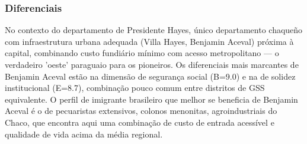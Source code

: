\subsubsection*{Diferenciais}\label{dif-benjamin-aceval-1502}
No contexto do departamento de Presidente Hayes, único departamento chaqueño com infraestrutura urbana adequada (Villa Hayes, Benjamin Aceval) próxima à capital, combinando custo fundiário mínimo com acesso metropolitano — o verdadeiro 'oeste' paraguaio para os pioneiros. Os diferenciais mais marcantes de Benjamin Aceval estão na dimensão de segurança social (B=9.0) e na de solidez institucional (E=8.7), combinação pouco comum entre distritos de GSS equivalente. O perfil de imigrante brasileiro que melhor se beneficia de Benjamin Aceval é o de pecuaristas extensivos, colonos menonitas, agroindustriais do Chaco, que encontra aqui uma combinação de custo de entrada acessível e qualidade de vida acima da média regional.
